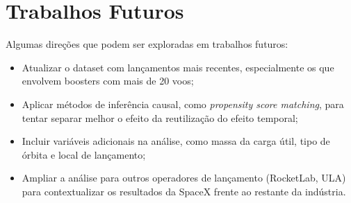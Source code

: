 \section{Trabalhos Futuros}

Algumas direções que podem ser exploradas em trabalhos futuros:

\begin{itemize}
    \item Atualizar o dataset com lançamentos mais recentes, especialmente os que envolvem boosters com mais de 20 voos;
    \item Aplicar métodos de inferência causal, como \textit{propensity score matching}, para tentar separar melhor o efeito da reutilização do efeito temporal;
    \item Incluir variáveis adicionais na análise, como massa da carga útil, tipo de órbita e local de lançamento;
    \item Ampliar a análise para outros operadores de lançamento (RocketLab, ULA) para contextualizar os resultados da SpaceX frente ao restante da indústria.
\end{itemize}
